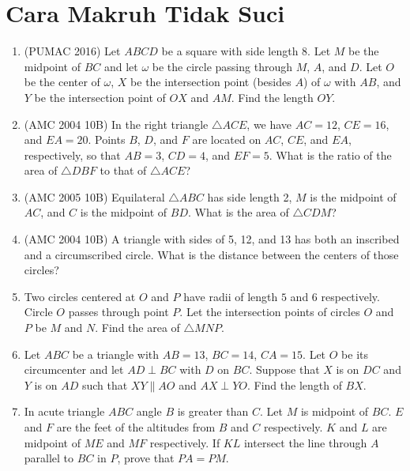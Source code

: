 \documentclass[12pt]{scrartcl}
\begin{document}
\section{Cara Makruh Tidak Suci}
\begin{enumerate}[resume]
    \item (PUMAC 2016) Let $ABCD$ be a square with side length 8. Let $M$ be the midpoint of $BC$ and let $\omega$ be the circle passing through $M$, $A$, and $D$. Let $O$ be the center of $\omega$, $X$ be the intersection point (besides $A$) of $\omega$ with $AB$, and $Y$ be the intersection point of $OX$ and $AM$. Find the length $OY$.

    \item (AMC 2004 10B) In the right triangle $\triangle ACE$, we have $AC = 12$, $CE = 16$, and $EA = 20$. Points $B$, $D$, and $F$ are located on $AC$, $CE$, and $EA$, respectively, so that $AB = 3$, $CD = 4$, and $EF = 5$. What is the ratio of the area of $\triangle DBF$ to that of $\triangle ACE$?

    \item (AMC 2005 10B) Equilateral $\triangle ABC$ has side length 2, $M$ is the midpoint of $AC$, and $C$ is the midpoint of $BD$. What is the area of $\triangle CDM$?

    \item (AMC 2004 10B) A triangle with sides of 5, 12, and 13 has both an inscribed and a circumscribed circle. What is the distance between the centers of those circles?

    \item Two circles centered at $O$ and $P$ have radii of length $5$ and $6$ respectively. Circle $O$ passes through point $P$. Let the intersection points of circles $O$ and $P$ be $M$ and $N$. Find the area of $\triangle MNP$.

    \item Let $ABC$ be a triangle with $AB = 13$, $BC = 14$, $CA = 15$. Let $O$ be its circumcenter and let $AD \perp BC$ with $D$ on $BC$. Suppose that $X$ is on $DC$ and $Y$ is on $AD$ such that $XY \parallel AO$ and $AX \perp YO$. Find the length of $BX$.


    \item In acute triangle $ABC$ angle $B$ is greater than $C$. Let $M$ is midpoint of $BC$. $E$ and $F$ are the feet of the altitudes from $B$ and $C$ respectively. $K$ and $L$ are midpoint of $ME$ and $MF$ respectively. If $KL$ intersect the line through $A$ parallel to $BC$ in $P$, prove that $PA = PM$.


\end{enumerate}
\end{document}
